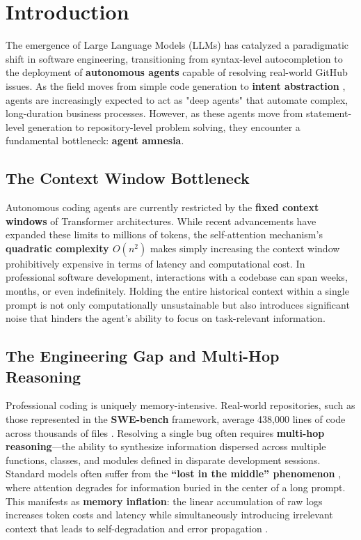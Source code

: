 \documentclass[conference]{IEEEtran}
\begin{document}
\section{Introduction}

The emergence of Large Language Models (LLMs) has catalyzed a paradigmatic shift in software engineering, transitioning from syntax-level autocompletion to the deployment of \textbf{autonomous agents} capable of resolving real-world GitHub issues. As the field moves from simple code generation to \textbf{intent abstraction} \cite{Xu2025Memory}, agents are increasingly expected to act as "deep agents" that automate complex, long-duration business processes. However, as these agents move from statement-level generation to repository-level problem solving, they encounter a fundamental bottleneck: \textbf{agent amnesia}.

\subsection{The Context Window Bottleneck}
Autonomous coding agents are currently restricted by the \textbf{fixed context windows} of Transformer architectures. While recent advancements have expanded these limits to millions of tokens, the self-attention mechanism's \textbf{quadratic complexity $O(n^2)$} \cite{Nan2025Nemori:} makes simply increasing the context window prohibitively expensive in terms of latency and computational cost. In professional software development, interactions with a codebase can span weeks, months, or even indefinitely. Holding the entire historical context within a single prompt is not only computationally unsustainable but also introduces significant noise that hinders the agent's ability to focus on task-relevant information.

\subsection{The Engineering Gap and Multi-Hop Reasoning}
Professional coding is uniquely memory-intensive. Real-world repositories, such as those represented in the \textbf{SWE-bench} framework, average 438,000 lines of code across thousands of files \cite{Jimenez2023SWEbench}. Resolving a single bug often requires \textbf{multi-hop reasoning}---the ability to synthesize information dispersed across multiple functions, classes, and modules defined in disparate development sessions. Standard models often suffer from the \textbf{``lost in the middle'' phenomenon} \cite{Jimenez2023SWEbench} \cite{Nan2025Nemori:}, where attention degrades for information buried in the center of a long prompt. This manifests as \textbf{memory inflation}: the linear accumulation of raw logs increases token costs and latency while simultaneously introducing irrelevant context that leads to self-degradation and error propagation \cite{Xu2025Memory}.
\end{document}
